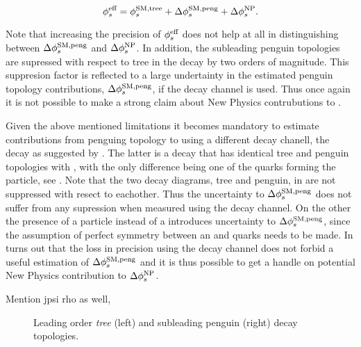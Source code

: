 \begin{equation}
\centering
 \phis^{\text {eff}} = \phis^{\tiny \text{SM,tree}} + \Delta\phiS{SM,peng} + \Delta\phis^{\tiny \text{NP}}.
 \label{app_phis_sm_peng}
\end{equation}

\noindent Note that increasing the precision of $\phi_{s}^{\text {eff}}$ does not help at all in distinguishing
between $\Delta\phi_{s}^{\tiny\text{SM,peng}}$ and $\Delta\phi_{s}^{\tiny \text{NP}}$. In addition, the subleading penguin
topologies are supressed with respect to tree in the \BsJpsiPhi decay by two orders of magnitude.
This suppresion factor is reflected to a large undertainty in the estimated penguin topology contributions,
$\Delta\phi_{s}^{\tiny\text{SM,peng}}$, if the \BsJpsiPhi decay channel is used. Thus once again it is not possible to
make a strong claim about New Physics contrubutions to \phis.

Given the above mentioned limitations it becomes mandatory to estimate contributions from
penguing topology to \phis using a different decay chanell, \eg the \BsJpsiKst decay as suggested by
\cite{}\cite{}. The latter is a decay that has identical tree and penguin topologies with \BsJpsiPhi,
with the only difference being one of the quarks forming the \Pphi particle, see .
Note that the two decay diagrams, tree and penguin, in \BsJpsiKst are not suppressed with resect to eachother.
Thus the uncertainty to $\Delta\phi_{s}^{\tiny\text{SM,peng}}$ does not suffer from any supression when measured using the
\BsJpsiKst decay channel. On the other the presence of a \Kstarz particle instead of a \Pphi introduces
uncertainty to $\Delta\phi_{s}^{\tiny\text{SM,peng}}$, since the assumption of perfect symmetry between an \squark and \dquark quarks
needs to be made. In turns out that the loss in precision using the \BsJpsiKst decay channel does not
forbid a useful estimation of $\Delta\phi_{s}^{\tiny\text{SM,peng}}$ and it is thus possible to get a handle on
potential New Physics contribution to $\Delta\phi_{s}^{\tiny \text{NP}}$.

{\color{red} Mention jpsi rho as well, }

\begin{figure}[t]
  \begin{subfigure}{0.5\textwidth}
    \raggedright
    {\scalebox{1}{\sffamily }}
    \label{app_jpsiphi_tree}
  \end{subfigure}%
  \hfill
  \begin{subfigure}{0.5\textwidth}
    \raggedleft
    {\scalebox{1}{\sffamily }}
    \label{app_jpsiphi_peng}
  \end{subfigure}
    \caption{Leading order {\it tree} (left) and subleading penguin (right) \BsJpsiPhi decay topologies.}
  \label{app_jpsiphi_tree_peng}
\end{figure}

